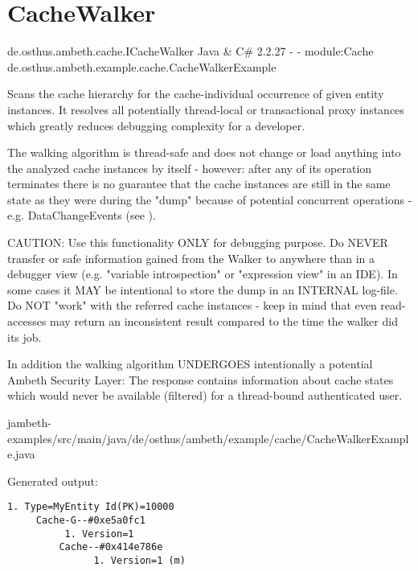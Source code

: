 \section{CacheWalker}
\label{feature:CacheWalker}

\feature
	{de.osthus.ambeth.cache.ICacheWalker}
	{Java \& C\#}
	{2.2.27}
	{-}
	{-}
	{module:Cache}
	{de.osthus.ambeth.example.cache.CacheWalkerExample}

Scans the cache hierarchy for the cache-individual occurrence of given entity instances. It resolves all potentially thread-local or transactional proxy instances which greatly reduces debugging complexity for a developer.\newline

The walking algorithm is thread-safe and does not change or load anything into the analyzed cache instances by itself - however: after any of its operation terminates there is no guarantee that the cache instances are still in the same state as they were during the "dump" because of potential concurrent operations - e.g. DataChangeEvents (see ).\newline

CAUTION: Use this functionality ONLY for debugging purpose. Do NEVER transfer or safe information gained from the Walker to anywhere than in a debugger view (e.g. "variable introspection" or "expression view" in an IDE). In some cases it MAY be intentional to store the dump in an INTERNAL log-file. Do NOT "work" with the referred cache instances - keep in mind that even read-accesses may return an inconsistent result compared to the time the walker did its job.\newline

In addition the walking algorithm UNDERGOES intentionally a potential Ambeth Security Layer: The response contains information about cache states which would never be available (filtered) for a thread-bound authenticated user.

	{jambeth-examples/src/main/java/de/osthus/ambeth/example/cache/CacheWalkerExample.java}

Generated output:

\begin{lstlisting}[style=Console]
	1. Type=MyEntity Id(PK)=10000
	 Cache-G--#0xe5a0fc1
		  1. Version=1
		 Cache--#0x414e786e
			   1. Version=1 (m)
\end{lstlisting}


